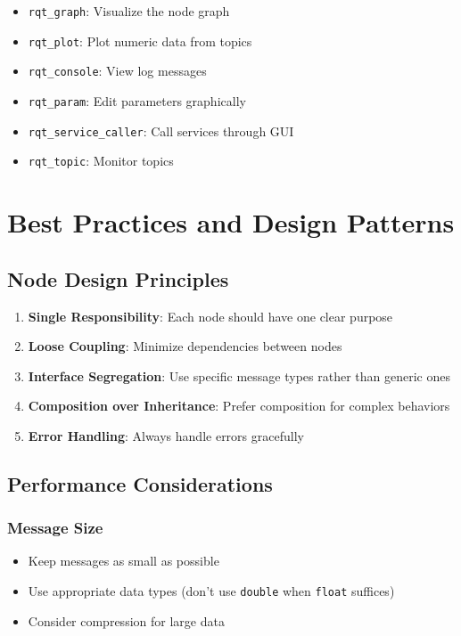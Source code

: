 \documentclass[a4paper,12pt]{book}
\newcommand{\code}[1]{\texttt{#1}}
\newcommand{\important}[1]{\textbf{\color{ros2orange}#1}}
\begin{document}
\begin{itemize}
\item \code{rqt\_graph}: Visualize the node graph
\item \code{rqt\_plot}: Plot numeric data from topics
\item \code{rqt\_console}: View log messages
\item \code{rqt\_param}: Edit parameters graphically
\item \code{rqt\_service\_caller}: Call services through GUI
\item \code{rqt\_topic}: Monitor topics
\end{itemize}

\chapter{Best Practices and Design Patterns}

\section{Node Design Principles}

\begin{enumerate}
\item \important{Single Responsibility}: Each node should have one clear purpose
\item \important{Loose Coupling}: Minimize dependencies between nodes
\item \important{Interface Segregation}: Use specific message types rather than generic ones
\item \important{Composition over Inheritance}: Prefer composition for complex behaviors
\item \important{Error Handling}: Always handle errors gracefully
\end{enumerate}

\section{Performance Considerations}

\subsection{Message Size}
\begin{itemize}
\item Keep messages as small as possible
\item Use appropriate data types (don't use \code{double} when \code{float} suffices)
\item Consider compression for large data
\end{itemize}
\end{document}
